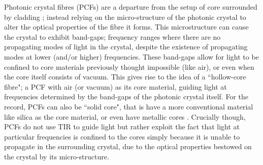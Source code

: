 Photonic crystal fibres (PCFs) are a departure from the setup of core surrounded by cladding \cite{russell2003photonic}; instead relying on the micro-structure of the photonic crystal to alter the optical properties of the fibre it forms.
This microstructure can cause the crystal to exhibit band-gaps; frequency ranges where there are no propagating modes of light in the crystal, despite the existence of propagating modes at lower (and/or higher) frequencies.
These band-gaps allow for light to be confined to core materials previously thought impossible (like air), or even when the core itself consists of vacuum.
This gives rise to the idea of a ``hollow-core fibre"; a PCF with air (or vacuum) as its core material, guiding light at frequencies determined by the band-gaps of the photonic crystal itself.
For the record, PCFs can also be ``solid core", that is have a more conventional material like silica as the core material, or even have metallic cores .
Crucially though, PCFs do not use TIR to guide light but rather exploit the fact that light at particular frequencies is confined to the cores simply because it is unable to propagate in the surrounding crystal, due to the optical properties bestowed on the crystal by its micro-structure.

